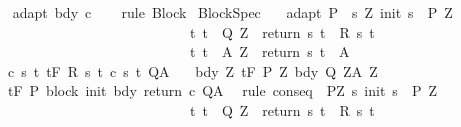 \begin{isabellebody}
\ \ %
\endisadelimproof
%
\isatagproof
{}\isamarkupfalse%
\ adapt\ bdy\ c\isanewline
\ \ \isamarkupfalse%
\ {\isacharparenleft}rule\ Block{\isacharparenright}%
\endisatagproof
{\isafoldproof}%
%
\isadelimproof
\isanewline
%
\endisadelimproof
\isanewline
{}\isamarkupfalse%
\ BlockSpec{\isacharcolon}\isanewline
\ \ \ adapt{\isacharcolon}\ {\isachardoublequoteopen}P\ {\isasymsubseteq}\ {\isacharbraceleft}s{\isachardot}\ {\isasymexists}Z{\isachardot}\ init\ s\ {\isasymin}\ P{\isacharprime}\ Z\ {\isasymand}\ \isanewline
\ \ \ \ \ \ \ \ \ \ \ \ \ \ \ \ \ \ \ \ \ \ \ \ \ \ \ \ \ {\isacharparenleft}{\isasymforall}t{\isachardot}\ t\ {\isasymin}\ Q{\isacharprime}\ Z\ {\isasymlongrightarrow}\ return\ s\ t\ {\isasymin}\ R\ s\ t{\isacharparenright}\ {\isasymand}\isanewline
\ \ \ \ \ \ \ \ \ \ \ \ \ \ \ \ \ \ \ \ \ \ \ \ \ \ \ \ \ {\isacharparenleft}{\isasymforall}t{\isachardot}\ t\ {\isasymin}\ A{\isacharprime}\ Z\ {\isasymlongrightarrow}\ return\ s\ t\ {\isasymin}\ A{\isacharparenright}{\isacharbraceright}{\isachardoublequoteclose}\isanewline
\ \ \ c{\isacharcolon}\ {\isachardoublequoteopen}{\isasymforall}s\ t{\isachardot}\ {\isasymGamma}{\isacharcomma}{\isasymTheta}{\isasymturnstile}\isactrlsub t\isactrlbsub {\isacharslash}F\isactrlesub \ {\isacharparenleft}R\ s\ t{\isacharparenright}\ {\isacharparenleft}c\ s\ t{\isacharparenright}\ Q{\isacharcomma}A{\isachardoublequoteclose}\isanewline
\ \ \ bdy{\isacharcolon}\ {\isachardoublequoteopen}{\isasymforall}Z{\isachardot}\ {\isasymGamma}{\isacharcomma}{\isasymTheta}{\isasymturnstile}\isactrlsub t\isactrlbsub {\isacharslash}F\isactrlesub \ {\isacharparenleft}P{\isacharprime}\ Z{\isacharparenright}\ bdy\ {\isacharparenleft}Q{\isacharprime}\ Z{\isacharparenright}{\isacharcomma}{\isacharparenleft}A{\isacharprime}\ Z{\isacharparenright}{\isachardoublequoteclose}\ \isanewline
\ \ \ {\isachardoublequoteopen}{\isasymGamma}{\isacharcomma}{\isasymTheta}{\isasymturnstile}\isactrlsub t\isactrlbsub {\isacharslash}F\isactrlesub \ P\ {\isacharparenleft}block\ init\ bdy\ return\ c{\isacharparenright}\ Q{\isacharcomma}A{\isachardoublequoteclose}\ \isanewline
%
\isadelimproof
%
\endisadelimproof
%
\isatagproof
{}\isamarkupfalse%
\ {\isacharparenleft}rule\ conseq\ {\isacharbrackleft}\ P{\isacharprime}{\isacharequal}{\isachardoublequoteopen}{\isasymlambda}Z{\isachardot}\ {\isacharbraceleft}s{\isachardot}\ init\ s\ {\isasymin}\ P{\isacharprime}\ Z\ {\isasymand}\ \isanewline
\ \ \ \ \ \ \ \ \ \ \ \ \ \ \ \ \ \ \ \ \ \ \ \ \ \ \ \ \ {\isacharparenleft}{\isasymforall}t{\isachardot}\ t\ {\isasymin}\ Q{\isacharprime}\ Z\ {\isasymlongrightarrow}\ return\ s\ t\ {\isasymin}\ R\ s\ t{\isacharparenright}\ {\isasymand}\isanewline

\end{isabellebody}
